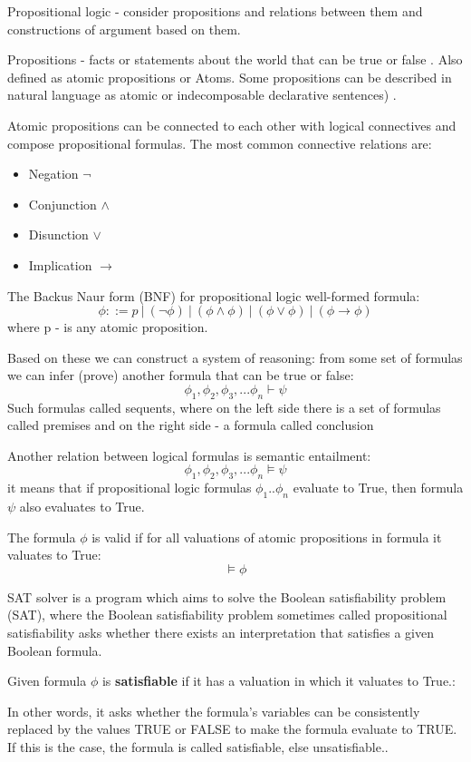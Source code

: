 Propositional logic - consider  propositions and relations between them and 
constructions of argument based on them.

Propositions - facts or statements about the world  that can be true or false
. Also defined as atomic propositions or Atoms.
Some propositions can be described in natural language as atomic or indecomposable 
declarative sentences) \cite{HuthR1}.


Atomic propositions can be connected to each other with logical connectives and compose propositional formulas.
The most common connective relations are:
\begin{itemize}
    \item Negation $ \neg $
    \item Conjunction $ \land $ 
    \item Disunction $ \lor $ 
    \item Implication $ \rightarrow $
\end{itemize}

The Backus Naur form (BNF) for propositional logic well-formed formula:
\[ \phi ::= p\ |\ (\neg \phi)\ |\ (\phi \land \phi)\ |\ (\phi\lor\phi)\ |\ (\phi\rightarrow\phi)    \]
where p - is any atomic proposition.

Based on these we can construct a system of reasoning: from some set of formulas we can infer (prove) another formula that can be true or false:
\[ \phi_1, \phi_2, \phi_3, ... \phi_n \vdash \psi \]
Such formulas called sequents, where on the left side there is a set of formulas called premises and on the right side - a formula called conclusion


Another relation between logical formulas  is semantic entailment:
\[ \phi_1, \phi_2, \phi_3, ... \phi_n \models \psi \]
it means that if propositional logic formulas $\phi_1 .. \phi_n$ evaluate to True, then formula $\psi$ also evaluates to True.

The formula $\phi$ is valid if for all valuations of atomic propositions in formula it valuates to True:
\[ \models \phi \]


SAT solver is a program which aims to solve the Boolean satisfiability problem 
(SAT), where the Boolean satisfiability problem sometimes called 
propositional satisfiability asks whether there 
exists an interpretation that satisfies a given Boolean formula. 

Given formula  $\phi$ is \textbf{satisfiable} if it has a valuation in which it valuates to True.:

In other words, it asks whether the formula's variables can be 
consistently replaced by the values TRUE or FALSE to make the formula 
evaluate to TRUE. If this is the case, the formula is called satisfiable, 
else unsatisfiable.\cite{HuthR1}.

